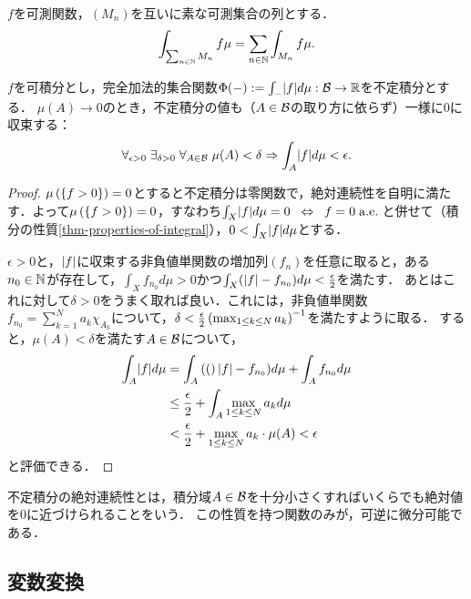 \documentclass[uplatex, dvipdfmx]{jsreport}
\begin{document}
\begin{theorem}
    $f$を可測関数，$(M_n)$を互いに素な可測集合の列とする．
    \[\int_{\sum_{n\in\mathbb{N}}M_n}f\mu=\sum_{n\in\mathbb{N}}\int_{M_n}f\mu.\]
\end{theorem}

\begin{theorem}[不定積分は絶対連続な加法的集合関数である]\label{thm-indefinite-integral-is-absolutely-continuous}
    $f$を可積分とし，完全加法的集合関数$\Phi(-):=\int_{-}\lvert f\rvert d\mu:\mathcal{B}\to\mathbb{R}$を不定積分とする．
    $\mu(A)\to 0$のとき，不定積分の値も（$A\in\mathcal{B}$の取り方に依らず）一様に$0$に収束する：
    \[\forall_{\epsilon>0}\;\exists_{\delta>0}\;\forall_{A\in\mathcal{B}}\;\mu(A)<\delta\Rightarrow\int_A\lvert f\rvert d\mu<\epsilon.\]
\end{theorem}
\begin{proof}
    $\mu\left(\left\{f>0\right\}\right)=0$とすると不定積分は零関数で，絶対連続性を自明に満たす．よって$\mu\left(\left\{f>0\right\}\right)=0$，すなわち$\int_X\lvert f\rvert d\mu=0\;\;\Leftrightarrow\;\; f=0\;\mathrm{a.e.}\;$と併せて（積分の性質\ref{thm-properties-of-integral}），$0<\int_X\lvert f\rvert d\mu$とする．

    $\epsilon>0$と，$\lvert f\rvert$に収束する非負値単関数の増加列$(f_n)$を任意に取ると，ある$n_0\in\mathbb{N}$が存在して，$\int_Xf_{n_0}d\mu>0$かつ$\int_X(\lvert f\rvert-f_{n_0})d\mu<\frac{\epsilon}{2}$を満たす．
    あとはこれに対して$\delta>0$をうまく取れば良い．これには，非負値単関数$f_{n_0}=\sum^N_{k=1}a_k\chi_{A_k}$について，$\delta<\frac{\epsilon}{2}\left(\max_{1\le k\le N}a_k\right)^{-1}$を満たすように取る．
    すると，$\mu(A)<\delta$を満たす$A\in\mathcal{B}$について，
    \begin{align*}
        \int_A\lvert f\rvert d\mu&=\int_A\left((\right)\lvert f\rvert-f_{n_0})d\mu+\int_Af_{n_0}d\mu\\
        &\le\frac{\epsilon}{2}+\int_A\max_{1\le k\le N}a_kd\mu\\
        &<\frac{\epsilon}{2}+\max_{1\le k\le N}a_k\cdot\mu(A)<\epsilon
    \end{align*}
    と評価できる．
\end{proof}
\begin{remarks}
    不定積分の絶対連続性とは，積分域$A\in\mathcal{B}$を十分小さくすればいくらでも絶対値を$0$に近づけられることをいう．
    この性質を持つ関数のみが，可逆に微分可能である．
\end{remarks}

\subsection{変数変換}
\end{document}

